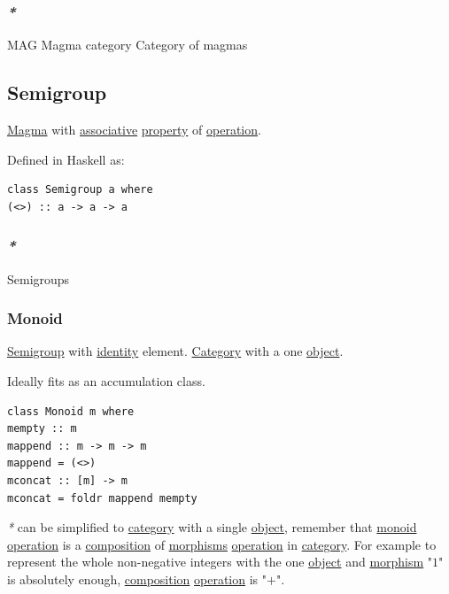 \documentclass[a4paper,14pt,oneside]{book}
\begin{document}
\subsubsection{\emph{*}}
\label{sec:orgbbf0061}

\label{org8b79232}MAG
\label{orgdf141e8}Magma category
\label{orge96a03f}Category of magmas

\subsection{\label{org171e6aa}Semigroup}
\label{sec:orge0f0895}
\hyperref[org0eb54f8]{Magma} with \hyperref[org9127e11]{associative} \hyperref[org81d0df4]{property} of \hyperref[orgf96349c]{operation}.

Defined in Haskell as:
\begin{verbatim}
class Semigroup a where
(<>) :: a -> a -> a
\end{verbatim}

\subsubsection{\emph{*}}
\label{sec:orgb4accf6}

\label{org019b39f}Semigroups

\subsubsection{\label{org9e1ff1f}Monoid}
\label{sec:org9578e73}
\hyperref[org171e6aa]{Semigroup} with \hyperref[org5f89edb]{identity} element. \hyperref[org82baa03]{Category} with a one \hyperref[org8d6cd26]{object}.

Ideally fits as an accumulation class.

\begin{verbatim}
class Monoid m where
mempty :: m
mappend :: m -> m -> m
mappend = (<>)
mconcat :: [m] -> m
mconcat = foldr mappend mempty
\end{verbatim}

\emph{*} can be simplified to \hyperref[org82baa03]{category} with a single \hyperref[org8d6cd26]{object}, remember that \hyperref[org9e1ff1f]{monoid} \hyperref[orgf96349c]{operation} is a \hyperref[orgc4a089b]{composition} of \hyperref[orgfb70910]{morphisms} \hyperref[orgf96349c]{operation} in \hyperref[org82baa03]{category}.
For example to represent the whole non-negative integers with the one \hyperref[org8d6cd26]{object} and \hyperref[orgcfa41a6]{morphism} "\(1\)" is absolutely enough, \hyperref[orgc4a089b]{composition} \hyperref[orgf96349c]{operation} is "\(+\)".
\end{document}

